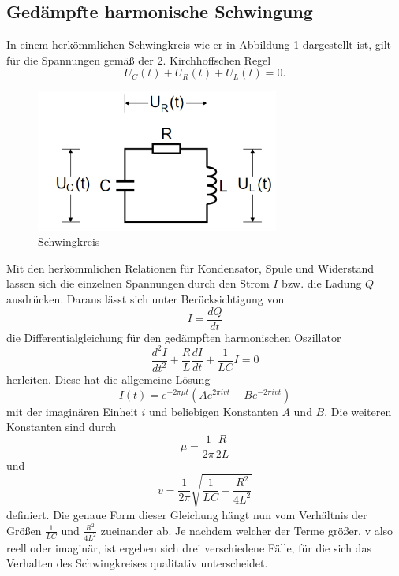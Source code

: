 \subsection{Gedämpfte harmonische Schwingung}
In einem herkömmlichen Schwingkreis wie er in Abbildung \ref{fig:Schwingkreis} dargestellt ist, gilt für die Spannungen gemäß der 2. Kirchhoffschen Regel
\begin{equation*}
U_C(t) +U_R(t)+U_L(t)=0.
\end{equation*}
\begin{figure}
\centering
\includegraphics[width=8cm, keepaspectratio]{Schwingkreis}
\caption{Schwingkreis}
\label{fig:Schwingkreis}
\end{figure}
Mit den herkömmlichen Relationen für Kondensator, Spule und Widerstand lassen sich die einzelnen Spannungen durch den Strom $I$ bzw. die Ladung $Q$ ausdrücken. Daraus lässt sich unter Berücksichtigung von
\begin{equation*}
I=\frac{dQ}{dt}
\end{equation*}
die Differentialgleichung für den gedämpften harmonischen Oszillator
\begin{equation}
\frac{d^2I}{dt^2}+\frac{R}{L}\frac{dI}{dt}+\frac{1}{LC}I=0
\end{equation}
herleiten. Diese hat die allgemeine Lösung 
\begin{equation}
I(t)=e^{-2\pi \mu t}(Ae^{2\pi ivt}+Be^{-2\pi ivt})
\end{equation}  
mit der imaginären Einheit $i$ und beliebigen Konstanten $A$ und $B$. Die weiteren Konstanten sind durch 
\begin{equation*}
\mu=\frac{1}{2\pi}\frac{R}{2L}
\end{equation*}
und
\begin{equation}
v=\frac{1}{2\pi}\sqrt{\frac{1}{LC}-\frac{R^2}{4L^2}}
\end{equation}
definiert. Die genaue Form dieser Gleichung hängt nun vom Verhältnis der Größen $\frac{1}{LC}$ und $\frac{R^2}{4L^2}$ zueinander ab. Je nachdem welcher der Terme größer, v also reell oder imaginär, ist ergeben sich drei verschiedene Fälle, für die sich das Verhalten des Schwingkreises qualitativ unterscheidet. \\
